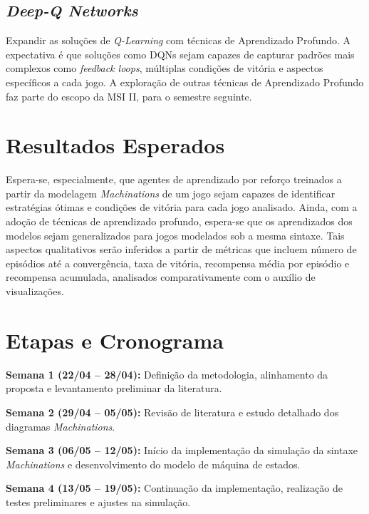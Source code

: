 \documentclass[10pt,a4paper]{article}
\begin{document}
\subsection{\textit{Deep-Q Networks}}
Expandir as soluções de \textit{Q-Learning} com técnicas de Aprendizado Profundo. A expectativa é que soluções como DQNs sejam capazes de capturar padrões mais complexos como \textit{feedback loops}, múltiplas condições de vitória e aspectos específicos a cada jogo. A exploração de outras técnicas de Aprendizado Profundo faz parte do escopo da MSI II, para o semestre seguinte.

\section{Resultados Esperados}
\label{expected-results}

Espera-se, especialmente, que agentes de aprendizado por reforço treinados a partir da modelagem \textit{Machinations} de um jogo sejam capazes de identificar estratégias ótimas e condições de vitória para cada jogo analisado. Ainda, com a adoção de técnicas de aprendizado profundo, espera-se que os aprendizados dos modelos sejam generalizados para jogos modelados sob a mesma sintaxe. Tais aspectos qualitativos serão inferidos a partir de métricas que incluem número de episódios até a convergência, taxa de vitória, recompensa média por episódio e recompensa acumulada, analisados comparativamente com o auxílio de visualizações.
\section{Etapas e Cronograma}
\label{plan}

\textbf{Semana 1 (22/04 -- 28/04):} Definição da metodologia, alinhamento da proposta e levantamento preliminar da literatura.

\vspace{0.5em} %

\textbf{Semana 2 (29/04 -- 05/05):} Revisão de literatura e estudo detalhado dos diagramas \textit{Machinations}.

\vspace{0.5em}

\textbf{Semana 3 (06/05 -- 12/05):} Início da implementação da simulação da sintaxe \textit{Machinations} e desenvolvimento do modelo de máquina de estados.

\vspace{0.5em}

\textbf{Semana 4 (13/05 -- 19/05):} Continuação da implementação, realização de testes preliminares e ajustes na simulação.
\end{document}
